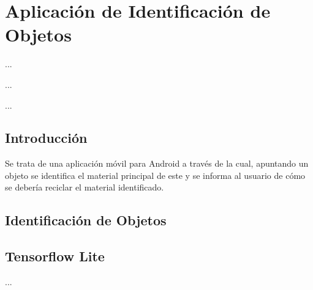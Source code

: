 %
%

\chapter{Aplicación de Identificación de Objetos}

\begin{FraseCelebre}
\begin{Frase}
...
\end{Frase}
\begin{Fuente}
...
\end{Fuente}
\end{FraseCelebre}

\begin{resumen}
...
\end{resumen}


\section{Introducción}
\label{cap5:sec:introduccion}

Se trata de una aplicación móvil para Android a través de la cual, apuntando un objeto se identifica el material principal de este y se informa al usuario de cómo se debería reciclar el material identificado.


\section{Identificación de Objetos}
\label{cap5:sec:identificacion-objetos}


\section{Tensorflow Lite}
\label{cap5:sec:tensorflow-lite}


...

\section*{\NotasBibliograficas}
\TocNotasBibliograficas

